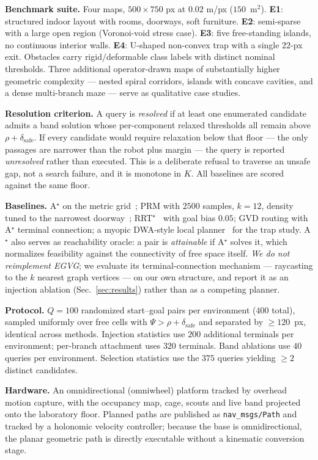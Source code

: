 \documentclass[conference]{IEEEtran}
\begin{document}
\textbf{Benchmark suite.} Four maps, $500\times750$ px at $0.02$ m/px ($150$~m$^2$). \textbf{E1}: structured indoor layout with rooms, doorways, soft furniture. \textbf{E2}: semi-sparse with a large open region (Voronoi-void stress case). \textbf{E3}: five free-standing islands, no continuous interior walls. \textbf{E4}: U-shaped non-convex trap with a single $22$-px exit. Obstacles carry rigid/deformable class labels with distinct nominal thresholds. Three additional operator-drawn maps of substantially higher geometric complexity --- nested spiral corridors, islands with concave cavities, and a dense multi-branch maze --- serve as qualitative case studies.

\textbf{Resolution criterion.} A query is \emph{resolved} if at least one enumerated candidate admits a band solution whose per-component relaxed thresholds all remain above $\rho+\delta_{\mathrm{safe}}$. If every candidate would require relaxation below that floor --- the only passages are narrower than the robot plus margin --- the query is reported \emph{unresolved} rather than executed. This is a deliberate refusal to traverse an unsafe gap, not a search failure, and it is monotone in $K$. All baselines are scored against the same floor.

\textbf{Baselines.} A$^\star$ on the metric grid~\cite{hart1968}; PRM with $2500$ samples, $k=12$, density tuned to the narrowest doorway~\cite{kavraki1996}; RRT$^\star$~\cite{karaman2011} with goal bias $0.05$; GVD routing with A$^\star$ terminal connection; a myopic DWA-style local planner~\cite{fox1997} for the trap study. A$^\star$ also serves as reachability oracle: a pair is \emph{attainable} if A$^\star$ solves it, which normalizes feasibility against the connectivity of free space itself. \emph{We do not reimplement EGVG}; we evaluate its terminal-connection mechanism --- raycasting to the $k$ nearest graph vertices --- on our own structure, and report it as an injection ablation (Sec.~\ref{sec:results}) rather than as a competing planner.

\textbf{Protocol.} $Q=100$ randomized start--goal pairs per environment ($400$ total), sampled uniformly over free cells with $\Psi>\rho+\delta_{\mathrm{safe}}$ and separated by $\ge 120$~px, identical across methods. Injection statistics use $200$ additional terminals per environment; per-branch attachment uses $320$ terminals. Band ablations use $40$ queries per environment. Selection statistics use the $375$ queries yielding $\ge 2$ distinct candidates.

\textbf{Hardware.} An omnidirectional (omniwheel) platform tracked by overhead motion capture, with the occupancy map, cage, scouts and live band projected onto the laboratory floor. Planned paths are published as \texttt{nav\_msgs/Path} and tracked by a holonomic velocity controller; because the base is omnidirectional, the planar geometric path is directly executable without a kinematic conversion stage.
\end{document}
